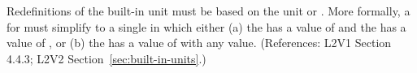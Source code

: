 Redefinitions of the built-in unit  must be based on the unit
 or .  More formally, a \UnitDefinition
for  must simplify to a single \Unit in which either (a) the
  has a value of  and the 
 has a value of , or (b) the   has a value
of  with any  value.  (References:
L2V1 Section 4.4.3; L2V2 Section~\ref{sec:built-in-units}.)
